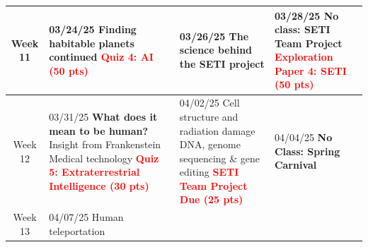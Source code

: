 \documentclass[11pt]{article}
\begin{document}
\begin{tabularx}{\textwidth}{|c|X|X|X|}
    \hline
    Week 11 & 
    
    03/24/25 \newline
    \newline 
    Finding habitable planets continued\newline
    \newline
    \textcolor{red}{\textbf{Quiz 4: AI (50 pts)}}
    &
    
    03/26/25 \newline
    \newline
    The science behind the SETI project \newline
    \newline
    &

    \cellcolor{gray!20} 03/28/25 \newline
    \newline
    \textbf{No class: SETI Team Project} \newline\newline
    \textcolor{red}{\textbf{Exploration Paper 4: SETI (50 pts)}}
    \\

    \hline
    Week 12 & 
    
    03/31/25 \newline
    \textbf{What does it mean to be human?}\newline
    Insight from Frankenstein \newline
    Medical technology \newline
    \textcolor{red}{\textbf{Quiz 5: Extraterrestrial Intelligence (30 pts)}}&
    
    04/02/25 \newline
    \newline
    Cell structure and radiation damage \newline
    DNA, genome sequencing \& gene editing\newline
    \textcolor{red}{\textbf{SETI Team Project Due (25 pts)}}&
    
    

    \cellcolor{gray!20}04/04/25 \newline
    \newline
    \textbf{No Class: Spring Carnival}
    \\
    
    \hline
    Week 13 & 

    04/07/25 \newline
    \newline
    Human teleportation&  
    

\end{tabularx}
\end{document}
